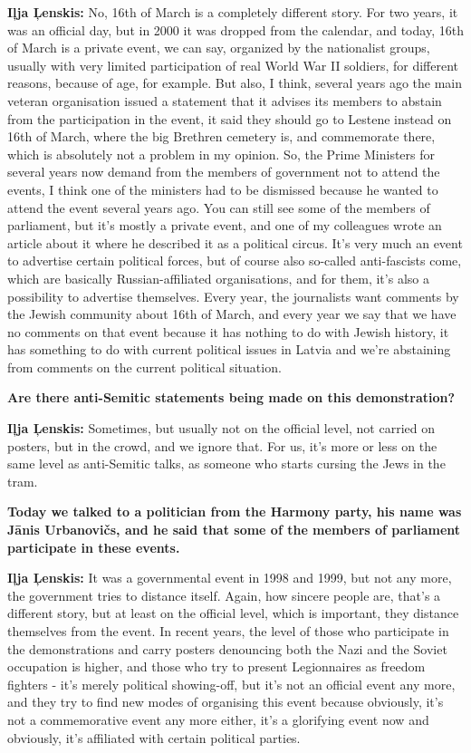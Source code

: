 \textbf{Iļja Ļenskis:} No, 16th of March is a completely different story. For two years, it was an official day, but in 2000 it was dropped from the calendar, and today, 16th of March is a private event, we can say, organized by the nationalist groups, usually with very limited participation of real World War II soldiers, for different reasons, because of age, for example. But also, I think, several years ago the main veteran organisation issued a statement that it advises its members to abstain from the participation in the event, it said they should go to Lestene instead  on 16th of March, where the big Brethren cemetery is, and commemorate there, which is absolutely not a problem in my opinion. So, the Prime Ministers for several years now demand from the members of government not to attend the events, I think one of the ministers had to be dismissed because he wanted to attend the event several years ago. You can still see some of the members of parliament, but it’s mostly a private event, and one of my colleagues wrote an article about it where he described it as a political circus. It’s very much an event to advertise certain political forces, but of course also so-called anti-fascists come, which are basically Russian-affiliated organisations, and for them, it’s also a possibility to advertise themselves. Every year, the journalists want comments by the Jewish community about 16th of March, and every year we say that we have no comments on that event because it has nothing to do with Jewish history, it has something to do with current political issues in Latvia and we’re abstaining from comments on the current political situation. 

\textbf{Are there anti-Semitic statements being made on this demonstration?} 

\textbf{Iļja Ļenskis:} Sometimes, but usually not on the official level, not carried on posters, but in the crowd, and we ignore that. 
For us, it’s more or less on the same level as anti-Semitic talks, as someone who starts cursing the Jews in the tram. 

\textbf{Today we talked to a politician from the Harmony party, his name was Jānis Urbanovičs, and he said that some of the members of parliament participate in these events.} 

\textbf{Iļja Ļenskis:} It was a governmental event in 1998 and 1999, but not any more, the government tries to distance itself. Again, how sincere people are, that’s a different story, but at least on the official level, which is important, they distance themselves from the event. In recent years, the level of those who participate in the demonstrations and carry posters denouncing both the Nazi and the Soviet occupation  is higher, and those who try to present Legionnaires as freedom fighters - it’s merely political showing-off, but it’s not an official event any more, and they try to find new modes of organising this event because obviously, it’s not a commemorative event any more either, it’s a glorifying event now and obviously, it’s affiliated with certain political parties. 

